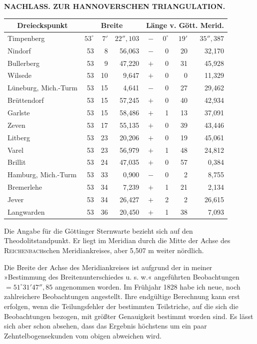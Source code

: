 \par\clearpage
\noindent{}\hfill{\small\textbf{NACHLASS. ZUR HANNOVERSCHEN TRIANGULATION.}}\hfill\null\par\medskip
\begin{center}
\begingroup\setlength{\tabcolsep}{4pt}\renewcommand{\arraystretch}{1.25}
\begin{tabular}{|l|rrr|rrrr|}
\hline
\multicolumn{1}{|c|}{Dreieckspunkt}&\multicolumn{3}{c|}{Breite}&\multicolumn{4}{c|}{Länge v. Gött. Merid.}\\\hline
Timpenberg&$53^\circ$&$7'$&$22''{,}103$&$-$&$0^\circ$&$19'$&$35''{,}387$\\
Nindorf&53&8&56,063&$-$&0&20&32,170\\
Bullerberg&53&9&47,220&$+$&0&31&45,928\\
Wilsede&53&10&9,647&$+$&0&0&11,329\\
Lüneburg, Mich.-Turm&53&15&4,641&$-$&0&27&29,462\\
Brüttendorf&53&15&57,245&$+$&0&40&42,934\\
Garlste&53&15&58,486&$+$&1&13&37,091\\
Zeven&53&17&55,135&$+$&0&39&43,446\\
Litberg&53&23&20,206&$+$&0&19&45,061\\
Varel&53&23&56,979&$+$&1&48&24,812\\
Brillit&53&24&47,035&$+$&0&57&0,384\\
Hamburg, Mich.-Turm&53&33&0,900&$-$&0&2&8,755\\
Bremerlehe&53&34&7,239&$+$&1&21&2,134\\
Jever&53&34&26,427&$+$&2&2&26,615\\
Langwarden&53&36&20,450&$+$&1&38&7,093\\
\end{tabular}\endgroup
\end{center}
\par\noindent\hspace*{\parindent}Die Angabe für die Göttinger Sternwarte bezieht sich auf den Theodolitstandpunkt. Er liegt im Meridian durch die Mitte der Achse des \textsc{Reichenbach}schen Meridiankreises, aber 5,507 m weiter nördlich.

\par\noindent\hspace*{\parindent}Die Breite der Achse des Meridiankreises ist aufgrund der in meiner »Bestimmung des Breitenunterschiedes u. s. w.« angeführten Beobachtungen $=51^\circ31'47''{,}85$ angenommen worden. Im Frühjahr 1828 habe ich neue, noch zahlreichere Beobachtungen angestellt. Ihre endgültige Berechnung kann erst erfolgen, wenn die Teilungsfehler der bestimmten Teilstriche, auf die sich die Beobachtungen bezogen, mit größter Genauigkeit bestimmt worden sind. Es lässt sich aber schon absehen, dass das Ergebnis höchstens um ein paar Zehntelbogensekunden vom obigen abweichen wird.

